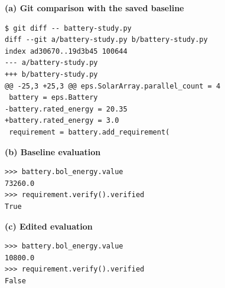 \documentclass[border=5pt]{standalone}
\begin{document}
\begin{minipage}{510pt}
\fontsize{10}{12}\selectfont
\textbf{(a) Git comparison with the saved baseline}\par
\begin{lstlisting}[style=report-diff,basicstyle=\ttfamily\fontsize{8.5}{10.88}\selectfont]
$ git diff -- battery-study.py
diff --git a/battery-study.py b/battery-study.py
index ad30670..19d3b45 100644
--- a/battery-study.py
+++ b/battery-study.py
@@ -25,3 +25,3 @@ eps.SolarArray.parallel_count = 4
 battery = eps.Battery
-battery.rated_energy = 20.35
+battery.rated_energy = 3.0
 requirement = battery.add_requirement(
\end{lstlisting}
\par\medskip
\begin{minipage}[t]{250pt}
\vspace{0pt}\textbf{(b) Baseline evaluation}\par\smallskip
\begin{lstlisting}[style=report-python,basicstyle=\ttfamily\fontsize{8.5}{10.88}\selectfont]
>>> battery.bol_energy.value
73260.0
>>> requirement.verify().verified
True
\end{lstlisting}
\end{minipage}\hfill
\begin{minipage}[t]{250pt}
\vspace{0pt}\textbf{(c) Edited evaluation}\par\smallskip
\begin{lstlisting}[style=report-python,basicstyle=\ttfamily\fontsize{8.5}{10.88}\selectfont]
>>> battery.bol_energy.value
10800.0
>>> requirement.verify().verified
False
\end{lstlisting}
\end{minipage}
\end{minipage}
\end{document}
